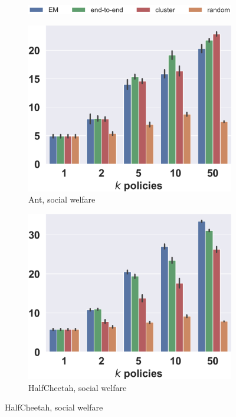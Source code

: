 \documentclass[letterpaper]{article} %
\begin{document}
\begin{figure}[t]
\begin{center}

    \centering
    \begin{subfigure}{.55\linewidth}
        \centering
        \includegraphics[width=\linewidth]{pics/legend_bars.png}
    \end{subfigure}
    
    \begin{subfigure}{0.245\textwidth}
        \centering
        \caption{Ant, social welfare}
        \includegraphics[width=\linewidth]{pics/Ant-v4_bars.png}
    \end{subfigure}%
    \hfill%
    \begin{subfigure}{0.245\textwidth}
        \centering
        \caption{HalfCheetah, social welfare}
        \includegraphics[width=\linewidth]{pics/HalfCheetah-v4_bars.png}

\end{subfigure}
\end{center}
\end{figure}
\end{document}
